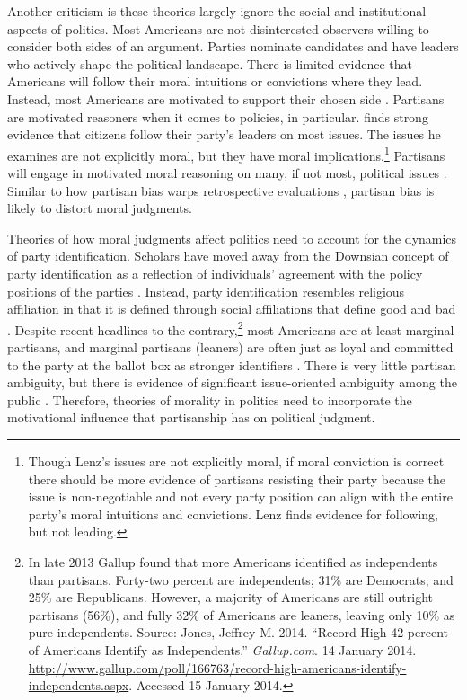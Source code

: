 Another criticism is these theories largely ignore the social and institutional aspects of politics. Most Americans are not disinterested observers willing to consider both sides of an argument. Parties nominate candidates and have leaders who actively shape the political landscape. There is limited evidence that Americans will follow their moral intuitions or convictions where they lead. Instead, most Americans are motivated to support their chosen side \cite{TaberLodgeGlathar2001}. Partisans are motivated reasoners when it comes to policies, in particular.  finds strong evidence that citizens follow their party's leaders on most issues. The issues he examines are not explicitly moral, but they have moral implications.\footnote{Though Lenz's issues are not explicitly moral, if moral conviction is correct there should be more evidence of partisans resisting their party because the issue is non-negotiable and not every party position can align with the entire party's moral intuitions and convictions. Lenz finds evidence for following, but not leading.} Partisans will engage in motivated moral reasoning on many, if not most, political issues \cite{Dittoetal2009}. Similar to how partisan bias warps retrospective evaluations \cite{Bartels2002b}, partisan bias is likely to distort moral judgments.

Theories of how moral judgments affect politics need to account for the dynamics of party identification. Scholars have moved away from the Downsian concept of party identification as a reflection of individuals' agreement with the policy positions of the parties \cite{Downs1957}. Instead, party identification resembles religious affiliation in that it is defined through social affiliations that define good and bad \cite{GreenPalmquistSchickler2002}. Despite recent headlines to the contrary,\footnote{In late 2013 Gallup found that more Americans identified as independents than partisans. Forty-two percent are independents; 31\% are Democrats; and 25\% are Republicans. However, a majority of Americans are still outright partisans (56\%), and fully 32\% of Americans are leaners, leaving only 10\% as pure independents. Source: Jones, Jeffrey M. 2014. ``Record-High 42 percent of Americans Identify as Independents.'' \emph{Gallup.com}. 14 January 2014. \url{http://www.gallup.com/poll/166763/record-high-americans-identify-independents.aspx}. Accessed 15 January 2014.} most Americans are at least marginal partisans, and marginal partisans (leaners) are often just as loyal and committed to the party at the ballot box as stronger identifiers \cite{Keithetal1992}. There is very little partisan ambiguity, but there is evidence of significant issue-oriented ambiguity among the public \cite{FeldmanZaller1992}. Therefore, theories of morality in politics need to incorporate the motivational influence that partisanship has on political judgment.

